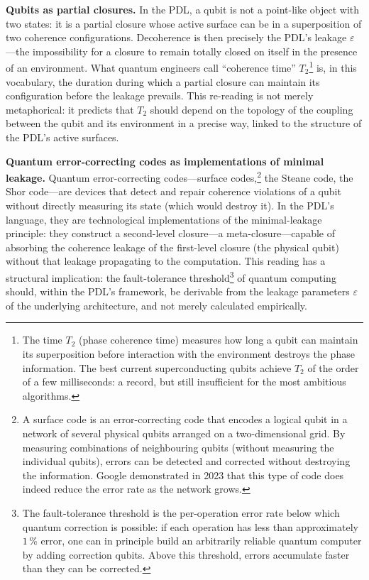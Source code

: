 \documentclass[12pt, a4paper, openright]{book}
\begin{document}
\medskip

\textbf{Qubits as partial closures.} In the PDL, a qubit is not a point-like object with two states: it is a partial closure whose active surface can be in a superposition of two coherence configurations. Decoherence is then precisely the PDL's leakage $\varepsilon$---the impossibility for a closure to remain totally closed on itself in the presence of an environment. What quantum engineers call ``coherence time'' $T_2$\footnote{The time $T_2$ (phase coherence time) measures how long a qubit can maintain its superposition before interaction with the environment destroys the phase information. The best current superconducting qubits achieve $T_2$ of the order of a few milliseconds: a record, but still insufficient for the most ambitious algorithms.} is, in this vocabulary, the duration during which a partial closure can maintain its configuration before the leakage prevails. This re-reading is not merely metaphorical: it predicts that $T_2$ should depend on the topology of the coupling between the qubit and its environment in a precise way, linked to the structure of the PDL's active surfaces.

\medskip

\textbf{Quantum error-correcting codes as implementations of minimal leakage.} Quantum error-correcting codes---surface codes,\footnote{A surface code is an error-correcting code that encodes a logical qubit in a network of several physical qubits arranged on a two-dimensional grid. By measuring combinations of neighbouring qubits (without measuring the individual qubits), errors can be detected and corrected without destroying the information. Google demonstrated in 2023 that this type of code does indeed reduce the error rate as the network grows.} the Steane code, the Shor code---are devices that detect and repair coherence violations of a qubit without directly measuring its state (which would destroy it). In the PDL's language, they are technological implementations of the minimal-leakage principle: they construct a second-level closure---a meta-closure---capable of absorbing the coherence leakage of the first-level closure (the physical qubit) without that leakage propagating to the computation. This reading has a structural implication: the fault-tolerance threshold\footnote{The fault-tolerance threshold is the per-operation error rate below which quantum correction is possible: if each operation has less than approximately $1\,\%$ error, one can in principle build an arbitrarily reliable quantum computer by adding correction qubits. Above this threshold, errors accumulate faster than they can be corrected.} of quantum computing should, within the PDL's framework, be derivable from the leakage parameters $\varepsilon$ of the underlying architecture, and not merely calculated empirically.
\end{document}
